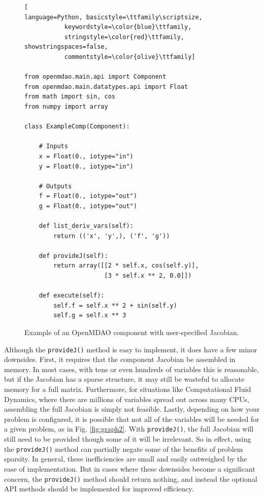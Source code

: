 \documentclass[]{aiaa-tc} %
\begin{document}
\begin{figure}
\begin{minipage}{\textwidth}
\begin{lstlisting}[
language=Python, basicstyle=\ttfamily\scriptsize,
           keywordstyle=\color{blue}\ttfamily,
           stringstyle=\color{red}\ttfamily, showstringspaces=false,
           commentstyle=\color{olive}\ttfamily]

from openmdao.main.api import Component
from openmdao.main.datatypes.api import Float
from math import sin, cos
from numpy import array

class ExampleComp(Component):

    # Inputs
    x = Float(0., iotype="in")
    y = Float(0., iotype="in")

    # Outputs
    f = Float(0., iotype="out")
    g = Float(0., iotype="out")

    def list_deriv_vars(self):
        return (('x', 'y',), ('f', 'g'))

    def provideJ(self):
        return array([[2 * self.x, cos(self.y)],
                      [3 * self.x ** 2, 0.0]])

    def execute(self):
        self.f = self.x ** 2 + sin(self.y)
        self.g = self.x ** 3

\end{lstlisting}
\caption{Example of an OpenMDAO
component with user-specified Jacobian.
\label{fig:code-block-1}}
\end{minipage}

\end{figure}

        Although the \texttt{provideJ()} method is easy to implement, it does have a few minor downsides. First,
        it requires that the component Jacobian be assembled in memory. In most cases, with tens or even hundreds of variables
        this is reasonable, but if the Jacobian has a sparse structure, it may still be wasteful to allocate memory for a
        full matrix. Furthermore, for situations like Computational Fluid Dynamics, where there are millions of variables spread out
        across many CPUs, assembling the full Jacobian is simply not feasible. Lastly, depending on how
        your problem is configured, it is possible that not all of the variables will be needed for a given problem, as in Fig. \ref{fig:graph2}. 
        With \texttt{provideJ()}, the full Jacobian will still need to be provided though some of it will be irrelevant.
        So in effect, using the \texttt{provideJ()} method can partially negate some of the benefits of problem sparsity. 
        In general, these inefficiencies are small and easily outweighed by the ease of implementation. But in cases where 
        these downsides become a significant concern, the \texttt{provideJ()} method should return nothing, and instead the
        optional API methods should be implemented for improved efficiency.
\end{document}
